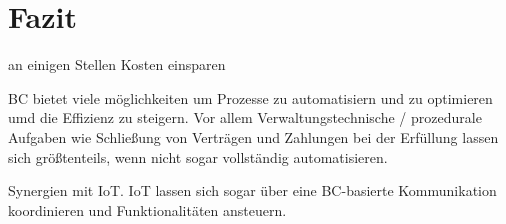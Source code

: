 \section{Fazit}





an einigen Stellen Kosten einsparen

BC bietet viele möglichkeiten um Prozesse zu automatisiern und zu optimieren umd die Effizienz zu steigern.
Vor allem Verwaltungstechnische / prozedurale Aufgaben wie Schließung von Verträgen und Zahlungen bei der
Erfüllung lassen sich größtenteils, wenn nicht sogar vollständig automatisieren.


Synergien mit IoT. IoT lassen sich sogar über eine BC-basierte Kommunikation koordinieren 
und Funktionalitäten ansteuern.